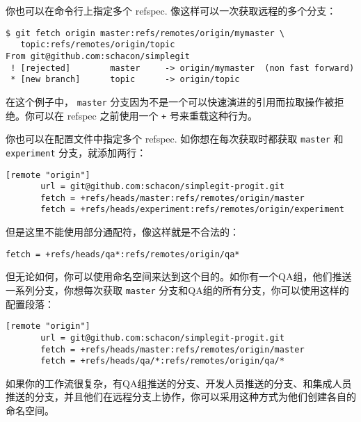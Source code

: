 \documentclass[a4paper]{book}
\begin{document}
你也可以在命令行上指定多个 refspec. 像这样可以一次获取远程的多个分支：

\begin{shaded}\begin{verbatim}
$ git fetch origin master:refs/remotes/origin/mymaster \
   topic:refs/remotes/origin/topic
From git@github.com:schacon/simplegit
 ! [rejected]        master     -> origin/mymaster  (non fast forward)
 * [new branch]      topic      -> origin/topic
\end{verbatim}\end{shaded}

在这个例子中， \texttt{master} 分支因为不是一个可以快速演进的引用而拉取操作被拒绝。你可以在 refspec 之前使用一个 \texttt{+} 号来重载这种行为。

你也可以在配置文件中指定多个 refspec. 如你想在每次获取时都获取 \texttt{master} 和 \texttt{experiment} 分支，就添加两行：

\begin{shaded}\begin{verbatim}
[remote "origin"]
       url = git@github.com:schacon/simplegit-progit.git
       fetch = +refs/heads/master:refs/remotes/origin/master
       fetch = +refs/heads/experiment:refs/remotes/origin/experiment
\end{verbatim}\end{shaded}

但是这里不能使用部分通配符，像这样就是不合法的：

\begin{shaded}\begin{verbatim}
fetch = +refs/heads/qa*:refs/remotes/origin/qa*
\end{verbatim}\end{shaded}

但无论如何，你可以使用命名空间来达到这个目的。如你有一个QA组，他们推送一系列分支，你想每次获取 \texttt{master} 分支和QA组的所有分支，你可以使用这样的配置段落：

\begin{shaded}\begin{verbatim}
[remote "origin"]
       url = git@github.com:schacon/simplegit-progit.git
       fetch = +refs/heads/master:refs/remotes/origin/master
       fetch = +refs/heads/qa/*:refs/remotes/origin/qa/*
\end{verbatim}\end{shaded}

如果你的工作流很复杂，有QA组推送的分支、开发人员推送的分支、和集成人员推送的分支，并且他们在远程分支上协作，你可以采用这种方式为他们创建各自的命名空间。
\end{document}
